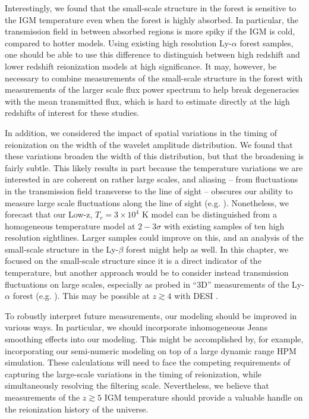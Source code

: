 Interestingly, we found that the small-scale structure in the
forest is sensitive to the IGM temperature even when the forest is highly absorbed. In particular, the transmission
field in between absorbed regions is more spiky if the IGM is cold, compared to hotter models. Using existing
high resolution Ly-$\alpha$ forest samples, one should be able to use this difference to 
distinguish between high redshift and lower
redshift reionization models at high significance. It may, however, be necessary to combine measurements
of the small-scale structure in the forest with measurements of the larger scale flux power spectrum to help
break degeneracies with the mean transmitted flux, which is hard to estimate directly at the high redshifts of
interest for these studies. 

In addition, we considered the impact of spatial variations in the timing of reionization on the width of
the wavelet amplitude distribution. We found that these variations broaden the width of this distribution, but
that the broadening is fairly subtle. This likely results in part because the temperature variations we
are interested in are coherent on rather large scales, and aliasing -- from fluctuations in the transmission
field transverse to the line of sight -- obscures our ability to measure large scale fluctuations along
the line of sight (e.g. \citealt{McQuinn:2010mq,Lai:2005ha}). Nonetheless, we forecast that our Low-z, $T_r=3 \times 10^4$
K model can be distinguished from a homogeneous temperature model at $2-3 \sigma$ with existing samples of ten high
resolution sightlines. Larger samples could improve on this, and an analysis of the small-scale structure in the
Ly-$\beta$ forest might help as well. In this chapter, we focused on the small-scale structure since it is a direct
indicator of the temperature, but another approach would be to consider instead transmission fluctuations on
large scales, especially as probed in ``3D'' measurements of the Ly-$\alpha$ forest (e.g. \citealt{McQuinn:2010mq}). This
may be possible at $z \gtrsim 4$ with DESI \citep{Levi:2013gra,McQuinn:2010mq}.

To robustly interpret future measurements, our modeling should be improved in various ways. In particular, we should incorporate
inhomogeneous Jeans smoothing effects into our modeling. This might be accomplished by, for example, 
incorporating our semi-numeric
modeling on top of a large dynamic range HPM \citep{Gnedin:1997td} simulation. These 
calculations will need to face
the competing requirements of capturing the large-scale variations in the timing of reionization, while simultaneously
resolving the filtering scale. Nevertheless, we believe that measurements of the $z \gtrsim 5$ IGM temperature should
provide a valuable handle on the reionization history of the universe.


